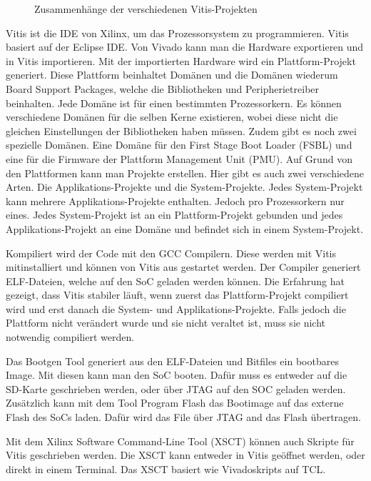 \begin{figure}[tb]
    \caption{Zusammenhänge der verschiedenen Vitis-Projekten}
    \label{fig:vitis}
\end{figure}

Vitis ist die IDE von Xilinx, um das Prozessorsystem zu programmieren. Vitis basiert auf der Eclipse IDE. 
Von Vivado kann man die Hardware exportieren und in Vitis importieren. Mit der importierten Hardware wird ein Plattform-Projekt generiert. Diese Plattform beinhaltet Domänen und die Domänen wiederum Board Support Packages, welche die Bibliotheken und Peripherietreiber beinhalten. Jede Domäne ist für einen bestimmten Prozessorkern. Es können verschiedene Domänen für die selben Kerne existieren, wobei diese nicht die gleichen Einstellungen der Bibliotheken haben müssen. Zudem gibt es noch zwei spezielle Domänen. Eine Domäne für den First Stage Boot Loader (FSBL) und eine für die Firmware der Plattform Management Unit (PMU). Auf Grund von den Plattformen kann man Projekte erstellen. Hier gibt es auch zwei verschiedene Arten. Die Applikations-Projekte und die System-Projekte. Jedes System-Projekt kann mehrere Applikations-Projekte enthalten. Jedoch pro Prozessorkern nur eines. Jedes System-Projekt ist an ein Plattform-Projekt gebunden und jedes Applikations-Projekt an eine Domäne und befindet sich in einem System-Projekt.

Kompiliert wird der Code mit den GCC Compilern. Diese werden mit Vitis mitinstalliert und können von Vitis aus gestartet werden. Der Compiler generiert ELF-Dateien, welche auf den SoC geladen werden können. Die Erfahrung hat gezeigt, dass Vitis stabiler läuft, wenn zuerst das Plattform-Projekt compiliert wird und erst danach die System- und Applikations-Projekte. Falls jedoch die Plattform nicht verändert wurde und sie nicht veraltet ist, muss sie nicht notwendig compiliert werden.

Das Bootgen Tool generiert aus den ELF-Dateien und Bitfiles ein bootbares Image. Mit diesen kann man den SoC booten. Dafür muss es entweder auf die SD-Karte geschrieben werden, oder über JTAG auf den SOC geladen werden. Zusätzlich kann mit dem Tool Program Flash das Bootimage auf das externe Flash des SoCs laden. Dafür wird das File über JTAG and das Flash übertragen.

Mit dem Xilinx Software Command-Line Tool (XSCT) können auch Skripte für Vitis geschrieben werden. Die XSCT kann entweder in Vitis geöffnet werden, oder direkt in einem Terminal. Das XSCT basiert wie Vivadoskripts auf TCL.

